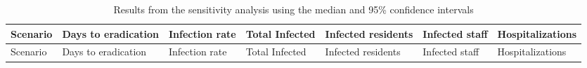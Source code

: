 \documentclass[
]{article}
\begin{document}
\begin{longtable}[]{@{}lllllll@{}}
\caption{Results from the sensitivity analysis using the median and 95\%
confidence intervals}\tabularnewline
\toprule
\begin{minipage}[b]{0.18\columnwidth}\raggedright
Scenario\strut
\end{minipage} & \begin{minipage}[b]{0.12\columnwidth}\raggedright
Days to eradication\strut
\end{minipage} & \begin{minipage}[b]{0.10\columnwidth}\raggedright
Infection rate\strut
\end{minipage} & \begin{minipage}[b]{0.11\columnwidth}\raggedright
Total Infected\strut
\end{minipage} & \begin{minipage}[b]{0.11\columnwidth}\raggedright
Infected residents\strut
\end{minipage} & \begin{minipage}[b]{0.09\columnwidth}\raggedright
Infected staff\strut
\end{minipage} & \begin{minipage}[b]{0.10\columnwidth}\raggedright
Hospitalizations\strut
\end{minipage}\tabularnewline
\midrule
\endfirsthead
\toprule
\begin{minipage}[b]{0.18\columnwidth}\raggedright
Scenario\strut
\end{minipage} & \begin{minipage}[b]{0.12\columnwidth}\raggedright
Days to eradication\strut
\end{minipage} & \begin{minipage}[b]{0.10\columnwidth}\raggedright
Infection rate\strut
\end{minipage} & \begin{minipage}[b]{0.11\columnwidth}\raggedright
Total Infected\strut
\end{minipage} & \begin{minipage}[b]{0.11\columnwidth}\raggedright
Infected residents\strut
\end{minipage} & \begin{minipage}[b]{0.09\columnwidth}\raggedright
Infected staff\strut
\end{minipage} & \begin{minipage}[b]{0.10\columnwidth}\raggedright
Hospitalizations\strut
\end{minipage}\tabularnewline

\end{longtable}
\end{document}
